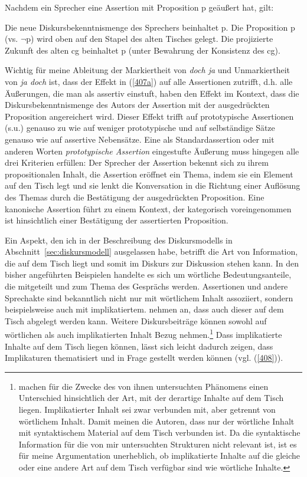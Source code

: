 \begin{exe}
	\ex\label{407} 
	Nachdem ein Sprecher eine Assertion mit Proposition p geäußert hat, gilt:
		\begin{xlist}	
			\ex\label{407a} Die neue Diskursbekenntnismenge des Sprechers beinhaltet p.
			\ex\label{407b} Die Proposition p (vs. $\neg$p) wird oben auf den Stapel des alten Tisches gelegt.
			\ex\label{407c} Die projizierte Zukunft des alten cg beinhaltet p (unter Bewahrung der Konsistenz des cg).
		\end{xlist}
\end{exe}
Wichtig für meine Ableitung der Markiertheit von \textit{doch ja} und Unmarkiertheit von \textit{ja doch} ist, dass der Effekt in (\ref{407a}) auf alle Assertionen zutrifft, d.h. alle Äußerungen, die man als assertiv einstuft, haben den Effekt im Kontext, dass die Diskursbekenntnismenge des Autors der Assertion mit der ausgedrückten Proposition angereichert wird. Dieser Effekt trifft auf prototypische Assertionen (s.u.) genauso zu wie auf weniger prototypische und auf selbständige Sätze genauso wie auf assertive Nebensätze. Eine als Standardassertion oder mit anderen Worten \textit{prototypische Assertion} eingestufte Äußerung muss hingegen alle drei Kriterien erfüllen: Der Sprecher der Assertion bekennt sich zu ihrem propositionalen Inhalt, die Assertion eröffnet ein Thema, indem sie ein Element auf den Tisch legt und sie lenkt die Konversation in die Richtung einer Auflösung des Themas durch die Bestätigung der ausgedrückten Proposition. Eine kano\-nische Assertion führt zu einem Kontext, der kategorisch voreingenommen ist hinsichtlich einer Bestätigung der assertierten Proposition. 

Ein Aspekt, den ich in der Beschreibung des Diskursmodells in Abschnitt~\ref{sec:diskursmodell} ausgelassen habe, betrifft die Art von Information, die auf dem Tisch liegt und somit im Diskurs zur Diskussion stehen kann. In den bisher angeführten Beispielen handelte es sich um wörtliche Bedeutungsanteile, die mitgeteilt und zum Thema des Gesprächs werden. Assertionen und andere Sprechakte sind bekannt\-lich nicht nur mit wörtlichem Inhalt assoziiert, sondern beispielsweise auch mit implikatiertem. \citet[94]{Farkas2010} nehmen an, dass auch dieser auf dem Tisch abgelegt werden kann. Weitere Diskursbeiträge können sowohl auf wörtlichen als auch implikatierten Inhalt Bezug nehmen.\footnote{\citet[94]{Farkas2010} machen für die Zwecke des von ihnen untersuchten Phänomens einen Unterschied hinsichtlich der Art, mit der derartige Inhalte auf dem Tisch liegen. Im\-plikatierter Inhalt sei zwar verbunden mit, aber getrennt von wörtlichem Inhalt. Damit meinen die Autoren, dass nur der wörtliche Inhalt mit syntaktischem Material auf dem Tisch verbunden ist. Da die syntaktische Information für die von mir untersuchten Strukturen nicht relevant ist, ist es für meine Argumentation unerheblich, ob implikatierte Inhalte auf die gleiche oder eine andere Art auf dem Tisch verfügbar sind wie wörtliche Inhalte.} Dass implikatierte Inhalte auf dem Tisch liegen können, lässt sich leicht dadurch zeigen, dass Implikaturen  thematisiert und in Frage gestellt werden können (vgl. (\ref{408})).

